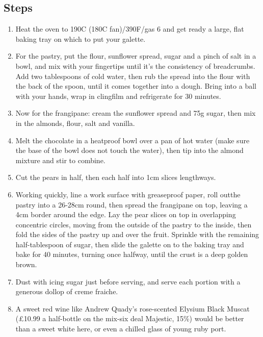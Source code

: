 \documentclass{book}
\begin{document}
\subsection*{Steps}
\begin{enumerate}
\item Heat the oven to 190C (180C fan)/390F/gas 6 and get ready a large, flat baking tray on which to put your galette.
\item For the pastry, put the flour, sunflower spread, sugar and a pinch of salt in a bowl, and mix with your fingertips until it’s the consistency of breadcrumbs. Add two tablespoons of cold water, then rub the spread into the flour with the back of the spoon, until it comes together into a dough. Bring into a ball with your hands, wrap in clingfilm and refrigerate for 30 minutes.
\item Now for the frangipane: cream the sunflower spread and 75g sugar, then mix in the almonds, flour, salt and vanilla.
\item Melt the chocolate in a heatproof bowl over a pan of hot water (make sure the base of the bowl does not touch the water), then tip into the almond mixture and stir to combine.
\item Cut the pears in half, then each half into 1cm slices lengthways. 
\item Working quickly, line a work surface with greaseproof paper, roll outthe pastry into a 26-28cm round, then spread the frangipane on top, leaving a 4cm border around the edge. Lay the pear slices on top in overlapping concentric circles, moving from the outside of the pastry to the inside, then fold the sides of the pastry up and over the fruit. Sprinkle with the remaining half-tablespoon of sugar, then slide the galette on to the baking tray and bake for 40 minutes, turning once halfway, until the crust is a deep golden brown.
\item Dust with icing sugar just before serving, and serve each portion with a generous dollop of creme fraiche.
\item A sweet red wine like Andrew Quady’s rose-scented Elysium Black Muscat (£10.99 a half-bottle on the mix-six deal Majestic, 15\%) would be better than a sweet white here, or even a chilled glass of young ruby port.
\end{enumerate}
\newpage
\end{document}

